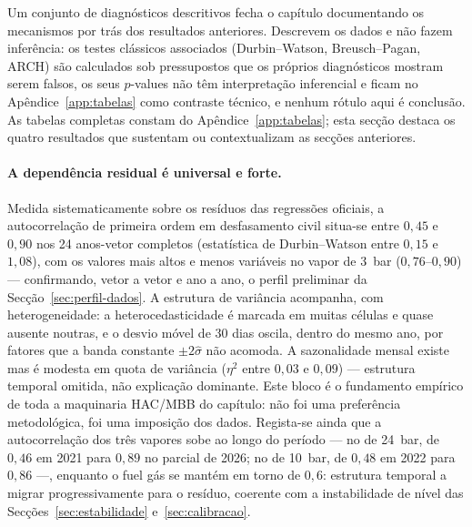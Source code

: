
Um conjunto de diagnósticos descritivos fecha o capítulo documentando os
mecanismos por trás dos resultados anteriores. Descrevem os dados e
não fazem inferência: os testes clássicos associados (Durbin--Watson,
Breusch--Pagan, ARCH) são calculados sob pressupostos que os próprios
diagnósticos mostram serem falsos, os seus $p$-values não têm interpretação
inferencial e ficam no Apêndice~\ref{app:tabelas} como contraste técnico, e
nenhum rótulo aqui é conclusão. As tabelas completas constam do Apêndice~\ref{app:tabelas};
esta secção destaca os quatro resultados que sustentam ou contextualizam as
secções anteriores.

\paragraph{A dependência residual é universal e forte.} Medida
sistematicamente sobre os resíduos das regressões oficiais, a autocorrelação
de primeira ordem em desfasamento civil situa-se entre $0{,}45$ e $0{,}90$
nos 24 anos-vetor completos (estatística de Durbin--Watson entre $0{,}15$ e
$1{,}08$), com os valores mais altos e menos variáveis no vapor de 3~bar
($0{,}76$--$0{,}90$) --- confirmando, vetor a vetor e ano a ano, o perfil
preliminar da Secção~\ref{sec:perfil-dados}. A estrutura de variância acompanha,
com heterogeneidade: a heterocedasticidade é marcada em muitas células e quase
ausente noutras, e o desvio móvel de 30 dias oscila, dentro do mesmo
ano, por fatores que a banda constante $\pm 2\hat\sigma$ não acomoda. A sazonalidade mensal existe mas é
modesta em quota de variância ($\eta^2$ entre $0{,}03$ e $0{,}09$) ---
estrutura temporal omitida, não explicação dominante. Este bloco é o
fundamento empírico de toda a maquinaria HAC/MBB do capítulo: não foi uma
preferência metodológica, foi uma imposição dos dados. Regista-se ainda que
a autocorrelação dos três vapores sobe ao longo do período --- no de
24~bar, de $0{,}46$ em 2021 para $0{,}89$ no parcial de 2026; no de 10~bar,
de $0{,}48$ em 2022 para $0{,}86$ ---, enquanto o fuel gás se mantém em
torno de $0{,}6$: estrutura temporal a migrar progressivamente para o
resíduo, coerente com a instabilidade de nível das
Secções~\ref{sec:estabilidade} e~\ref{sec:calibracao}.

